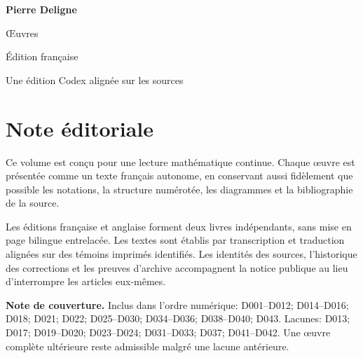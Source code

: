 \documentclass[11pt,a4paper]{article}
\begin{document}
\begin{titlepage}
  \pagecolor{DeligneBlue}
  \color{white}
  \vspace*{34mm}
  {\fontsize{30}{36}\selectfont\bfseries Pierre Deligne\par}
  \vspace{7mm}
  {\fontsize{18}{23}\selectfont Œuvres\par}
  \vspace{4mm}
  {\large Édition française\par}
  \vfill
  {\normalsize Une édition Codex alignée sur les sources\par}
\end{titlepage}
\setcounter{page}{2}
\nopagecolor
\color{DeligneInk}
\section*{Note éditoriale}
Ce volume est conçu pour une lecture mathématique continue. Chaque œuvre est présentée comme un texte français autonome, en conservant aussi fidèlement que possible les notations, la structure numérotée, les diagrammes et la bibliographie de la source.

Les éditions française et anglaise forment deux livres indépendants, sans mise en page bilingue entrelacée. Les textes sont établis par transcription et traduction alignées sur des témoins imprimés identifiés. Les identités des sources, l'historique des corrections et les preuves d'archive accompagnent la notice publique au lieu d'interrompre les articles eux-mêmes.

\textbf{Note de couverture.} Inclus dans l'ordre numérique: D001--D012; D014--D016; D018; D021; D022; D025--D030; D034--D036; D038--D040; D043. Lacunes: D013; D017; D019--D020; D023--D024; D031--D033; D037; D041--D042. Une œuvre complète ultérieure reste admissible malgré une lacune antérieure.
\end{document}
